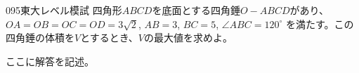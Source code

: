 \begin{thm}{095}{}{東大レベル模試}
 四角形$ABCD$を底面とする四角錘$O-ABCD$があり、$OA=OB=OC=OD=3\sqrt{2}$, $AB=3$, $BC=5$, $\angle{ABC}=120^\circ$ を満たす。この四角錘の体積を$V$とするとき、$V$の最大値を求めよ。
\end{thm}

ここに解答を記述。